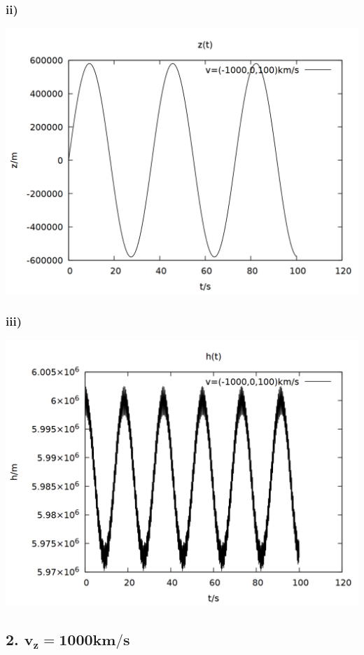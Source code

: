 \documentclass{scrreprt}
\begin{document}
\subsubsection*{ii)}
\begin{center}
\includegraphics[scale=0.25]{plot_1_ii.png}
\end{center}
\subsubsection*{iii)}
\begin{center}
\includegraphics[scale=0.25]{plot_1_iii.png}
\end{center}

\subsection*{2. $\mathbf{v_z = 1000km/s}$}
\end{document}
